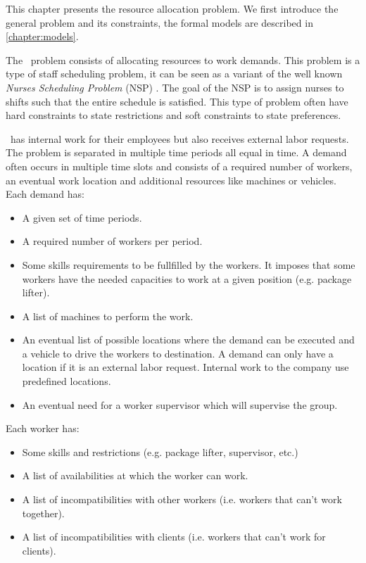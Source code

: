 \documentclass[../thesis.tex]{subfiles}
\begin{document}
This chapter presents the resource allocation problem.
We first introduce the general problem and its constraints, 
the formal models are described in \autoref{chapter:models}.

The \vone\ problem consists of allocating resources to work demands.
This problem is a type of staff scheduling problem, it can be seen as a variant of the 
well known \emph{Nurses Scheduling Problem} (NSP) \cite{Burke2004}. The goal of the NSP is to assign 
nurses to shifts such that the entire schedule is satisfied. 
This type of problem often have hard constraints to state restrictions 
and soft constraints to state preferences. 

\vone\ has internal work for their employees but also receives 
external labor requests. The problem is separated in multiple time periods all equal in time.
A demand often occurs in multiple time slots and consists of a required number of workers, an eventual 
work location and additional resources like machines or vehicles. Each demand has:

\begin{itemize}
  \item A given set of time periods.
  \item A required number of workers per period.
  \item Some skills requirements to be fullfilled by the workers. 
  It imposes that some workers have the needed capacities to work at a given position (e.g. package lifter).
  \item A list of machines to perform the work.
  \item An eventual list of possible locations where the demand can be executed and a vehicle to drive the workers to destination.
  A demand can only have a location if it is an external labor request. Internal work to the company use predefined locations.
  \item An eventual need for a worker supervisor which will supervise the group.
\end{itemize}


Each worker has:

\begin{itemize}
  \item Some skills and restrictions (e.g. package lifter, supervisor, etc.)
  \item A list of availabilities at which the worker can work.
  \item A list of incompatibilities with other workers (i.e. workers that can't work together).
  \item A list of incompatibilities with clients (i.e. workers that can't work for clients).
\end{itemize}
\end{document}

